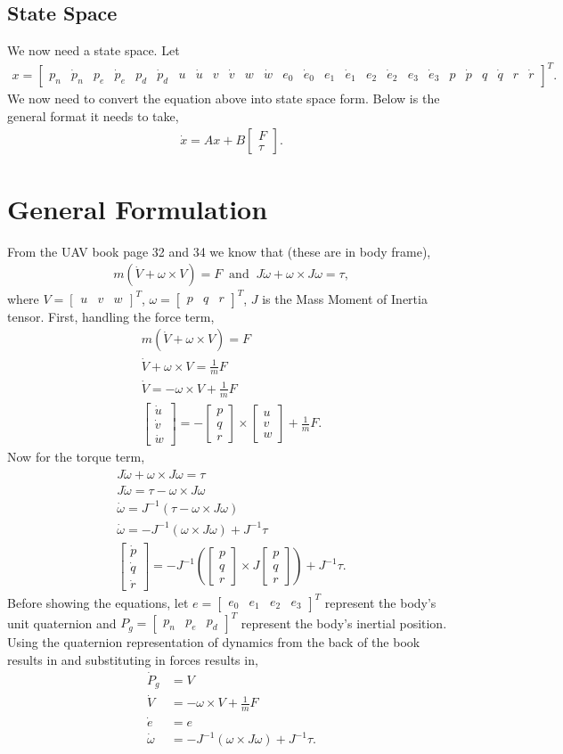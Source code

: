 \documentclass[11pt]{article}
\newcommand{\mathse}[1]{\begin{gather*}#1\end{gather*}}
\newcommand{\mat}[1]{\begin{bmatrix} #1 \end{bmatrix}}
\newcommand{\sinput}[1]{}
\begin{document}
\subsection{State Space}
We now need a state space. Let 
\mathse{
    x = \mat{p_n & \dot{p}_n & p_e & \dot{p}_e & p_d & \dot{p}_d & u & \dot{u} & v & \dot{v} & w & \dot{w} & e_0 & \dot{e}_0 & e_1 & \dot{e}_1 & e_2 & \dot{e}_2 & e_3 & \dot{e}_3 & p & \dot{p} & q & \dot{q} & r & \dot{r}}^T.
}
We now need to convert the equation above into state space form. Below is the general format it needs to take,
\mathse{
    \dot{x} = Ax + B\mat{F\\ \tau}.
}

\section{General Formulation}
From the UAV book page 32 and 34 we know that (these are in body frame),
\mathse{
    m\left(\dot{V} + \omega\times V\right) = F\;\;\text{and}\;\; J\dot{\omega} + \omega\times J\omega = \tau,
}
where $V = \mat{u & v & w}^T$, $\omega = \mat{p & q & r}^T$, $J$ is the Mass Moment of Inertia tensor. First, handling the force term,
\mathse{
    m\left(\dot{V} + \omega\times V\right) = F\\
    \dot{V} + \omega\times V = \frac{1}{m}F\\
    \dot{V} = -\omega\times V + \frac{1}{m}F\\
    \boxed{\mat{\dot{u}\\ \dot{v}\\ \dot{w}} = -\mat{p\\ q\\ r}\times\mat{u\\ v\\ w} + \frac{1}{m}F}.
}
Now for the torque term,
\mathse{
    J\dot{\omega} + \omega\times J\omega = \tau\\
    J\dot{\omega}  = \tau - \omega\times J\omega\\
    \dot{\omega}  = J^{-1}\left(\tau - \omega\times J\omega\right)\\
    \dot{\omega}  = -J^{-1}\left(\omega\times J\omega\right) + J^{-1}\tau\\
    \boxed{\mat{\dot{p}\\ \dot{q}\\ \dot{r}}  = -J^{-1}\left(\mat{p\\ q\\ r}\times J\mat{p\\ q\\ r}\right) + J^{-1}\tau}.
}
Before showing the equations, let $e = \mat{e_0 & e_1 & e_2 & e_3}^T$ represent the body's unit quaternion and $P_g = \mat{p_n & p_e & p_d}^T$ represent the body's inertial position.
Using the quaternion representation of dynamics from the back of the book results in and substituting in forces results in,
\begin{align*}
    \dot{P}_g &= \sinput{M1}V\\
    \dot{V} &= -\omega\times V  + \frac{1}{m}F\\
    \dot{e} &= \sinput{M3}e\\
    \dot{\omega} &= -J^{-1}\left(\omega\times J\omega\right) + J^{-1}\tau.
\end{align*}
\end{document}
